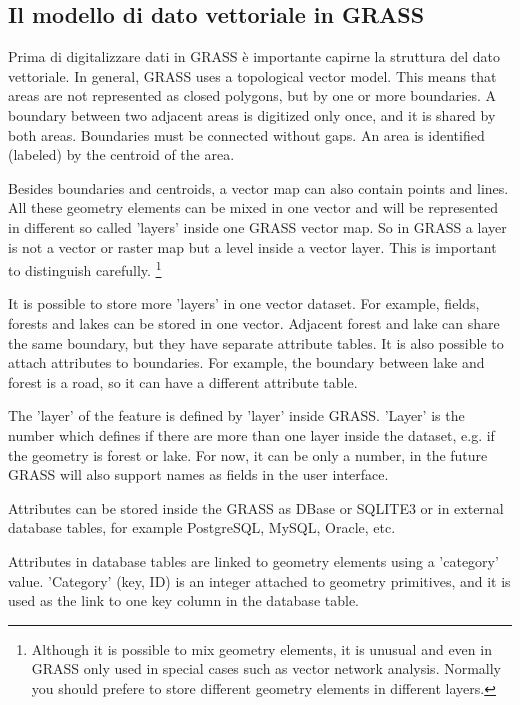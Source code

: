 \subsection{Il modello di dato vettoriale in GRASS}\label{label_vectmodel}

Prima di digitalizzare dati in GRASS è importante capirne la struttura del
dato vettoriale. In general, GRASS uses a topological
vector model. This means that areas are not represented
as closed polygons, but by one or more boundaries. A boundary between two
adjacent areas is digitized only once, and it is shared by both areas.
Boundaries must be connected without gaps. An area is identified (labeled) 
by the centroid of the area.

Besides boundaries and centroids, a vector map can also contain
points and lines. All these geometry elements can be mixed
in one vector and will be represented in different so called 'layers' inside
one GRASS vector map. So in GRASS a layer is not a vector or raster map but a
level inside a vector layer. This is important to distinguish carefully.
\footnote{Although it
is possible to mix geometry elements, it is unusual and even in GRASS only
used in special cases such as vector network analysis. Normally you should
prefere to store different geometry elements in different layers.}

It is possible to store more 'layers' in one vector dataset. For example,
fields, forests and lakes can be stored in one vector. Adjacent
forest and lake can share the same boundary, but they have separate attribute
tables. It is also possible to attach attributes to boundaries. For example,
the boundary between lake and forest is a road, so it can have a different 
attribute table.
 
The 'layer' of the feature is defined by 'layer' inside GRASS. 'Layer' is the 
number which defines if there are more than one layer inside the dataset, e.g. 
if the geometry is forest or lake. For now, it can be only a number, in the 
future GRASS will also support names as fields in the user interface.

Attributes can be stored inside the GRASS  as DBase or 
SQLITE3 or in external database tables, for example PostgreSQL, MySQL, 
Oracle, etc.

Attributes in database tables are linked to geometry elements using
a 'category' value. 'Category' (key, ID) is an
integer attached to geometry primitives, and it is used as the link to one
key column in the database table.


